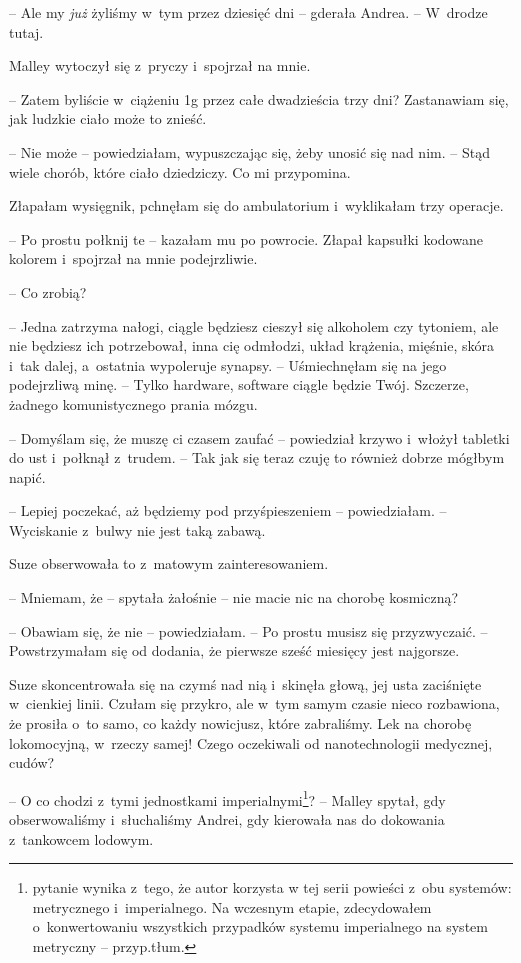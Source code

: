 \documentclass[oneside,polish,11pt,sfheadings]{mwbk}
\begin{document}
-- Ale my \textit{już} żyliśmy w~tym przez dziesięć dni -- gderała Andrea. -- W~drodze tutaj.

Malley wytoczył się z~pryczy i~spojrzał na mnie. 

-- Zatem byliście w~ciążeniu 1g przez całe dwadzieścia trzy dni? Zastanawiam się, jak
ludzkie ciało może to znieść.

-- Nie może -- powiedziałam, wypuszczając się, żeby unosić się nad nim. -- Stąd wiele chorób, które ciało dziedziczy. Co mi przypomina.

Złapałam wysięgnik, pchnęłam się do ambulatorium i~wyklikałam trzy
operacje.

-- Po prostu połknij te -- kazałam mu po powrocie. Złapał kapsułki
kodowane kolorem i~spojrzał na mnie podejrzliwie.

-- Co zrobią?

-- Jedna zatrzyma nałogi, ciągle będziesz cieszył się alkoholem czy
tytoniem, ale nie będziesz ich potrzebował, inna cię odmłodzi, układ
krążenia, mięśnie, skóra i~tak dalej, a~ostatnia wypoleruje synapsy. -- Uśmiechnęłam się na jego podejrzliwą minę. -- Tylko hardware, software
ciągle będzie Twój. Szczerze, żadnego komunistycznego prania mózgu.

-- Domyślam się, że muszę ci czasem zaufać -- powiedział krzywo i~włożył
tabletki do ust i~połknął z~trudem. -- Tak jak się teraz czuję to również
dobrze mógłbym napić.

-- Lepiej poczekać, aż będziemy pod przyśpieszeniem -- powiedziałam. -- Wyciskanie z~bulwy nie jest taką zabawą.

Suze obserwowała to z~matowym zainteresowaniem.

-- Mniemam, że -- spytała żałośnie -- nie macie nic na chorobę kosmiczną?

-- Obawiam się, że nie -- powiedziałam. -- Po prostu musisz się
przyzwyczaić. -- Powstrzymałam się od dodania, że pierwsze sześć miesięcy
jest najgorsze.

Suze skoncentrowała się na czymś nad nią i~skinęła głową, jej usta
zaciśnięte w~cienkiej linii. Czułam się przykro, ale w~tym samym czasie
nieco rozbawiona, że prosiła o~to samo, co każdy nowicjusz, które
zabraliśmy. Lek na chorobę lokomocyjną, w~rzeczy samej! Czego oczekiwali
od nanotechnologii medycznej, cudów?

-- O co chodzi z~tymi jednostkami imperialnymi\footnote{ pytanie wynika z~tego,
że autor korzysta w tej serii powieści z~obu systemów: metrycznego i~imperialnego. Na
wczesnym etapie, zdecydowałem o~konwertowaniu wszystkich przypadków systemu imperialnego na system
metryczny -- przyp.tłum.}? -- Malley spytał, gdy obserwowaliśmy i~słuchaliśmy Andrei, gdy kierowała nas do dokowania z~tankowcem lodowym.
\end{document}
